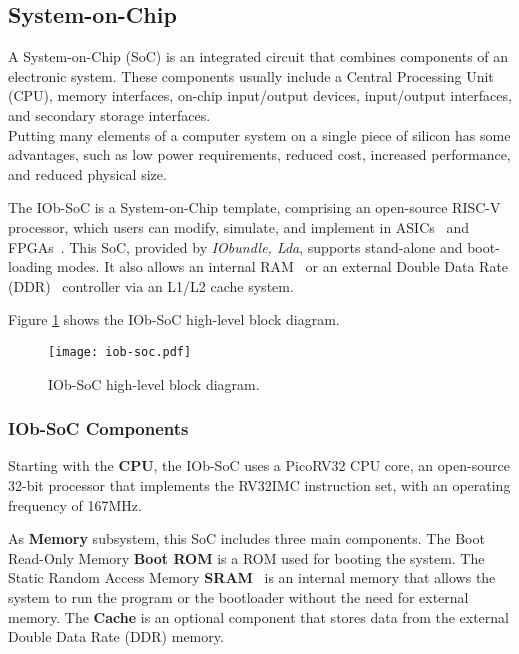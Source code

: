 
\subsection{System-on-Chip}
A System-on-Chip (SoC) is an integrated circuit that combines components of an electronic system. These components usually include a Central Processing Unit (CPU), memory interfaces, on-chip input/output devices, input/output interfaces, and secondary storage interfaces.\\
Putting many elements of a computer system on a single piece of silicon has some advantages, such as low power requirements, reduced cost, increased performance, and reduced physical size.

The IOb-SoC is a System-on-Chip template, comprising an open-source RISC-V~\cite{riscv} processor, which users can modify, simulate, and implement in ASICs~\cite{asic} and FPGAs~\cite{fpga}.
This SoC, provided by \textit{IObundle, Lda}, supports stand-alone and boot-loading modes. It also allows an internal RAM~\cite{ram} or an external Double Data Rate (DDR)~\cite{ddr} controller via an L1/L2 cache system. 

Figure \ref{fig:iob} shows the IOb-SoC high-level block diagram.

\vspace{0.1cm}

\begin{figure}[H]
\centerline{\texttt{[image: iob-soc.pdf]}}
\caption{IOb-SoC high-level block diagram.}
\label{fig:iob}
\end{figure}

\subsubsection{IOb-SoC Components}
Starting with the \textbf{CPU}, the IOb-SoC uses a PicoRV32 CPU core, an open-source 32-bit processor that implements the RV32IMC instruction set, with an operating frequency of 167MHz.

As \textbf{Memory} subsystem, this SoC includes three main components. The Boot Read-Only Memory \textbf{Boot ROM} is a ROM used for booting the system. The Static Random Access Memory \textbf{SRAM}~\cite{sram} is an internal memory that allows the system to run the program or the bootloader without the need for external memory. The \textbf{Cache} is an optional component that stores data from the external Double Data Rate (DDR) memory.

